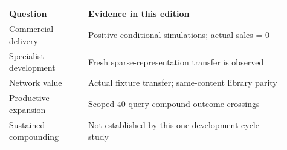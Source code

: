 \begin{center}\small\begin{tabular}{p{0.26\linewidth}p{0.65\linewidth}}
\toprule
Question & Evidence in this edition \\ \midrule
Commercial delivery & Positive conditional simulations; actual sales = 0 \\
Specialist development & Fresh sparse-representation transfer is observed \\
Network value & Actual fixture transfer; same-content library parity \\
Productive expansion & Scoped 40-query compound-outcome crossings \\
Sustained compounding & Not established by this one-development-cycle study \\
\bottomrule
\end{tabular}\end{center}
